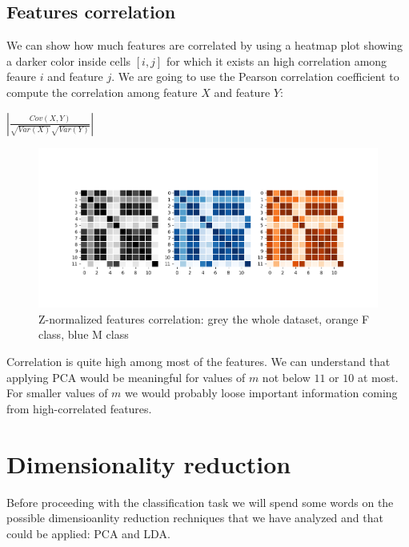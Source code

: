 \documentclass[10pt, a4paper, twocolumn]{article} %
\begin{document}
\subsection{Features correlation}
We can show how much features are correlated by using a heatmap plot showing a darker
color inside cells $[i, j]$ for which it exists an high correlation among feaure $i$ and 
feature $j$. We are going to use the Pearson correlation coefficient to compute the
correlation among feature $X$ and feature $Y$:
\begin{center}
	\begin{math}
		|\frac{Cov(X, Y)}{\sqrt{Var(X)}\sqrt{Var(Y)}}|
	\end{math}
\end{center}
\begin{figure}[ht!]
	\includegraphics[width=\linewidth]{./Pictures/FeaturesAnalysis/heatmap_znorm.png}
	\caption{Z-normalized features correlation: grey the whole dataset, orange F class, 
	blue M class}
	\label{heatmap} 
\end{figure}

Correlation is quite high among most of the features. We can understand that applying PCA
would be meaningful for values of $m$ not below $11$ or $10$ at most. For smaller values of $m$
we would probably loose important information coming from high-correlated features. 
\section{Dimensionality reduction}
Before proceeding with the classification task we will spend some words on the possible 
dimensioanlity reduction rechniques that we have analyzed and that could be applied: PCA and LDA.
\end{document}
